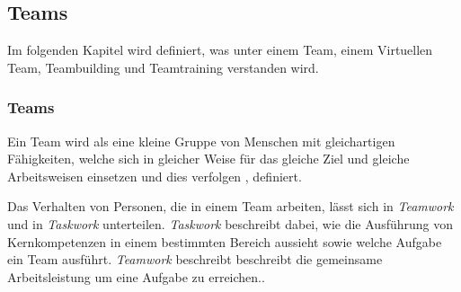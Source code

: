 \documentclass[a4paper,11pt]{article}%
\renewcommand{\\}{\vspace*{0.5\baselineskip} \newline}
\begin{document}

\newpage
	\subsection{Teams}		
	\label{Teamwork}
Im folgenden Kapitel wird definiert, was unter einem Team, einem Virtuellen Team, Teambuilding und Teamtraining verstanden wird.

\subsubsection{Teams}
\label{team}
	Ein Team wird als eine \dq{}kleine Gruppe von Menschen mit gleichartigen Fähigkeiten, welche sich in gleicher Weise für das gleiche Ziel und gleiche Arbeitsweisen einsetzen und dies verfolgen\dq{} \citep[p.2]{zenun2007effects}, definiert.
	
Das Verhalten von Personen, die in einem Team arbeiten, lässt sich in \textit{Teamwork} und in  \textit{Taskwork} unterteilen. \citep[p. 541-542]{rousseau2006teamwork}
 \textit{Taskwork} beschreibt dabei, wie die Ausführung von Kernkompetenzen in einem bestimmten Bereich aussieht sowie welche Aufgabe ein Team ausführt.
 \textit{Teamwork} beschreibt beschreibt die gemeinsame Arbeitsleistung um eine Aufgabe zu erreichen.\citep[p. 357]{marks2001temporally}.
 
\end{document}
